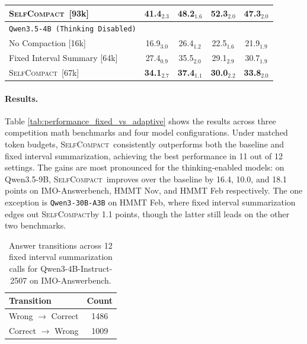 \documentclass{article}
\newcommand{\method}{\textsc{{SelfCompact}}}
\newcommand{\daniel}[1]{\textcolor{orange!70!black}{[Daniel: #1]}}
\begin{document}
\begin{table}[h!]
\begin{tabular}{lcccc}
\quad \method~[93k]                & \textbf{41.4}$_{2.3}$ & \textbf{48.2}$_{1.6}$ & \textbf{52.3}$_{2.0}$ & \textbf{47.3}$_{2.0}$ \\
\midrule
\texttt{Qwen3.5-4B (Thinking Disabled)} \\[2pt]
\quad No Compaction [16k]          & 16.9$_{3.0}$ & 26.4$_{1.2}$ & 22.5$_{1.6}$ & 21.9$_{1.9}$ \\
\quad Fixed Interval Summary [64k] & 27.4$_{0.9}$ & 35.5$_{2.0}$ & 29.1$_{2.9}$ & 30.7$_{1.9}$ \\
\quad \method~[67k]                & \textbf{34.1}$_{2.7}$ & \textbf{37.4}$_{1.1}$ & \textbf{30.0}$_{2.2}$ & \textbf{33.8}$_{2.0}$ \\
\bottomrule
\end{tabular}
\end{table}



\paragraph{Results.} Table \ref{tab:performance_fixed_vs_adaptive} shows the results across three competition math benchmarks and four model configurations. Under matched token budgets, \method~consistently outperforms both the baseline and fixed interval summarization, achieving the best performance in 11 out of 12 settings. The gains are most pronounced for the thinking-enabled models: on Qwen3.5-9B, \method~improves over the baseline by 16.4, 10.0, and 18.1 points on IMO-Answerbench, HMMT Nov, and HMMT Feb respectively. The one exception is \texttt{Qwen3-30B-A3B} on HMMT Feb, where fixed interval summarization edges out \method by 1.1 points, though the latter still leads on the other two benchmarks. 



\begin{table}
\vspace{-20pt}
\centering
\caption{Answer transitions across 12 fixed interval summarization calls for Qwen3-4B-Instruct-2507 on IMO-Answerbench.}
\vspace{10pt}
\label{tab:transitions}
\begin{tabular}{lc}
\toprule
Transition & Count \\
\midrule
Wrong $\rightarrow$ Correct & 1486 \\
Correct $\rightarrow$ Wrong & 1009 \\
\bottomrule
\end{tabular}
\vspace{-20pt}
\end{table}
\end{document}
